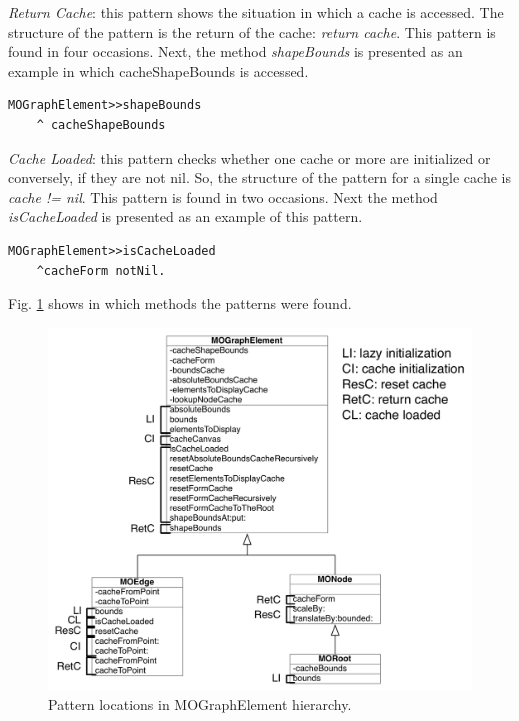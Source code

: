 \documentclass[preprint,10pt]{sigplanconf}
\begin{document}
\emph{Return Cache}: this pattern shows the situation in which a cache
is accessed. The structure of the pattern is the return of the cache:
\emph{return cache}. This pattern is found in four occasions. Next,
the method \emph{shapeBounds} is presented as an example in which
cacheShapeBounds is accessed.

\begin{lstlisting} 
MOGraphElement>>shapeBounds  
	^ cacheShapeBounds
\end{lstlisting}

\emph{Cache Loaded}: this pattern checks whether one cache or more
are initialized or conversely, if they are not nil. So, the structure of the
pattern for a single cache is \emph{cache != nil}. This pattern is
found in two occasions. Next the method \emph{isCacheLoaded} is presented
as an example of this pattern.

\begin{lstlisting} 
MOGraphElement>>isCacheLoaded 
	^cacheForm notNil. 
\end{lstlisting}

Fig. \ref{fig:Pattern-locations-in} shows in which methods the patterns
were found.%
\begin{figure}
\begin{centering}
\includegraphics[bb=186bp 306bp 497bp 644bp,scale=0.9]{PatternLocation} 
\par\end{centering}

\caption{Pattern locations in MOGraphElement hierarchy.\label{fig:Pattern-locations-in}}

\end{figure}
\end{document}
